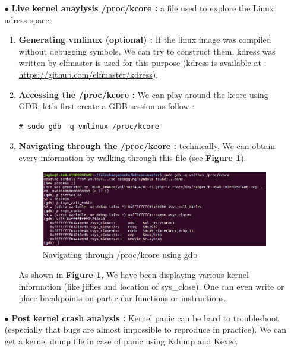 \begin{itemize}
	\item[$\bullet$] \textbf{Live kernel anaylysis /proc/kcore : } a file used to explore the Linux adress space.
		\begin{enumerate}
			\item \textbf{Generating vmlinux (optional) : } If the linux image was compiled without debugging symbols, We can try to construct them. \og kdress \fg was written by elfmaster is used for this purpose (kdress is available at : {\color{blue}\url{https://github.com/elfmaster/kdress}}).
			
			
			\item \textbf{Accessing the /proc/kcore : }  We can play around the kcore using GDB, let's first create a GDB session as follow :
	\begin{lstlisting}[style=BashInputStyle]
# sudo gdb -q vmlinux /proc/kcore
	\end{lstlisting}			

			\item \textbf{Navigating through the /proc/kcore : } technically, We can obtain every information by walking through this file (see \textbf{Figure \ref{Navigating through /proc/kcore using gdb}}).
	
	\begin{figure}[H]
		\centering
        \includegraphics[scale=0.40]{img/solution/gdb-kcore-proc-navigation.png}
        \caption{Navigating through /proc/kcore using gdb}
        \label{Navigating through /proc/kcore using gdb}
    \end{figure}		
As shown in \textbf{Figure \ref{Navigating through /proc/kcore using gdb}}, We have been displaying various kernel information (like jiffies and location of sys\_close). One can even write or place breakpoints on particular functions or instructions. 			
		\end{enumerate}
	\item[$\bullet$] \textbf{Post kernel crash analysis : } Kernel panic can be hard to troubleshoot (especially that bugs are almost impossible to reproduce in practice). We can get a kernel dump file in case of panic using Kdump and Kexec.
	

\end{itemize}
